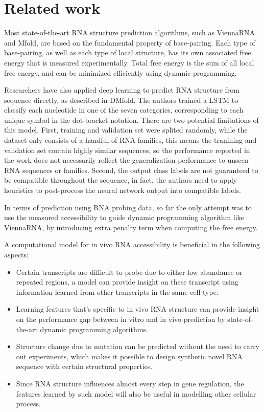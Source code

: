 \documentclass{proposal}
\begin{document}


\section{Related work}

Most state-of-the-art RNA structure prediction algorithms, such as ViennaRNA\cite{lorenz2011viennarna} and Mfold\cite{zuker2003mfold},
are based on the fundamental property of base-pairing.
Each type of base-pairing, as well as each type of local structure, has its own associated free energy that is measured experimentally.
Total free energy is the sum of all local free energy, and can be minimized efficiently using dynamic programming.

Researchers have also applied deep learning to predict RNA structure from sequence directly, as described in DMfold\cite{wang2019dmfold}.
The authors trained a LSTM to classify each nucleotide in one of the seven categories,
corresponding to each unique symbol in the dot-bracket notation.
There are two potential limitations of this model.
First, training and validation set were splited randomly, while the dataset only consists of a handful of RNA families,
this means the tranining and validation set contain highly similar sequences,
so the performance reported in the work does not necessarily reflect the generalization performance to unseen RNA sequences or families.
Second, the output class labels are not guaranteed to be compatible throughout the sequence, in fact,
the authors need to apply heuristics to post-process the neural network output into compatible labels.

In terms of prediction using RNA probing data,
so far the only attempt was to use the measured accessibility to guide dynamic programming algorithm like ViennaRNA\cite{lorenz2011viennarna},
by introducing extra penalty term when computing the free energy.

A computational model for in vivo RNA accessibility is beneficial in the following aspects:

\begin{itemize}
    \item Certain transcripts are difficult to probe due to either low abundance or repeated regions,
        a model can provide insight on these transcript using information learned from other transcripts in the same cell type.
    \item Learning features that's specific to in vivo RNA structure can provide
        insight on the performance gap between in vitro and in vivo prediction by state-of-the-art dynamic programming algorithms.
    \item Structure change due to mutation can be predicted without the need to carry out experiments,
        which makes it possible to design synthetic novel RNA sequence with certain structural properties.
    \item Since RNA structure influences almost every step in gene regulation,
        the features learned by such model will also be useful in modelling other cellular process.
\end{itemize}
\end{document}
